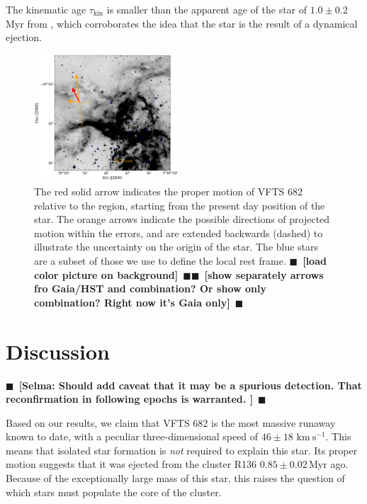 \documentclass[apjl,twocolumn]{emulateapj}
\newcommand{\todo}[1]{{\large $\blacksquare$~\textbf{\color{red}[#1]}}~$\blacksquare$}
\newcommand{\kms}{{\,\mathrm{km\ s^{-1}}}}
\begin{document}
The kinematic age $\tau_\mathrm{kin}$ is smaller than the apparent age
of the star of $1.0\pm 0.2$\,Myr from \cite{schneider:18}, which
corroborates the idea that the star is the result of a dynamical
ejection. 

\begin{figure}[tbp]
  \centering
  \includegraphics[width=0.48\textwidth]{./figures/main_plot_good}  
  \caption{The red solid arrow indicates the proper motion of VFTS 682
    relative to the region, starting from the present day position of
    the star. The orange arrows indicate the possible
    directions of projected motion within the errors, and are extended
    backwards (dashed) to illustrate the uncertainty on the origin of the
    star. The blue stars
    are a subset of those we use to define the local rest
    frame. \todo{load color picture on background}\todo{show
      separately arrows fro Gaia/HST and combination? Or show only
      combination? Right now it's Gaia only}}
  
  \label{fig:main}
\end{figure}


\section{Discussion}
\label{sec:discussion}
\todo{Selma: Should add caveat that it may be a spurious detection. That reconfirmation in following epochs is warranted. }

Based on our results, we claim that VFTS 682 is the most massive
runaway known to date, with a peculiar three-dimensional speed of $46\pm18\,\kms$. This means that isolated star formation is
\emph{not} required to explain this star. Its proper motion suggests that it was ejected from the cluster R136
$0.85\pm0.02$\,Myr ago. Because of the exceptionally large mass
of this star, this raises the question of which stars must populate
the core of the cluster.
\end{document}
